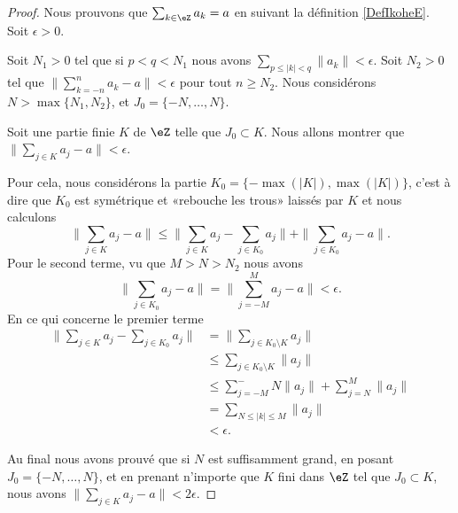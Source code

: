 \begin{proof}
	Nous prouvons que \( \sum_{k\in \eZ}a_k=a\) en suivant la définition \ref{DefIkoheE}. Soit \( \epsilon>0\).

	Soit \( N_1>0\) tel que si \( p<q<N_1\) nous avons \( \sum_{p\leq | k |<q}\| a_k \|<\epsilon\). Soit \( N_2>0\) tel que \( \| \sum_{k=-n}^{n}a_k-a \|<\epsilon\) pour tout \( n\geq N_2\). Nous considérons \( N>\max\{ N_1,N_2 \}\), et \( J_0=\{ -N,\ldots,N \}\).

	Soit une partie finie \( K\) de \( \eZ\) telle que \( J_0\subset K\). Nous allons montrer que \( \| \sum_{j\in K}a_j-a \|<\epsilon\).

	Pour cela, nous considérons la partie \( K_0=\{ -\max(| K |),\max(| K |) \}\), c'est à dire que \( K_0\) est symétrique et «rebouche les trous» laissés par \( K\) et nous calculons
	\begin{equation}
		\| \sum_{j\in K}a_j-a \|  \leq \| \sum_{j\in K}a_j-\sum_{j\in K_0}a_j \|+\| \sum_{j\in K_0}a_j-a \|.
	\end{equation}
	Pour le second terme, vu que \( M>N>N_2\) nous avons
	\begin{equation}
		\| \sum_{j\in K_0}a_j-a \|=\| \sum_{j=-M}^Ma_j-a \|<\epsilon.
	\end{equation}
	En ce qui concerne le premier terme
	\begin{subequations}
		\begin{align}
			\| \sum_{j\in K}a_j-\sum_{j\in K_0}a_j \| & =\| \sum_{j\in K_0\setminus K}a_j \|               \\
			                                          & \leq\sum_{j\in K_0\setminus K}\| a_j \|            \\
			                                          & \leq \sum_{j=-M}^-N\| a_j \|+\sum_{j=N}^M\| a_j \| \\
			                                          & =\sum_{N\leq | k |\leq M}\| a_j \|                 \\
			                                          & <\epsilon.
		\end{align}
	\end{subequations}

	Au final nous avons prouvé que si \( N\) est suffisamment grand, en posant \( J_0=\{ -N,\ldots,N \}\), et en prenant n'importe que \( K\) fini dans \( \eZ\) tel que \( J_0\subset K\), nous avons \( \| \sum_{j\in K}a_j-a \|<2\epsilon\).
\end{proof}


